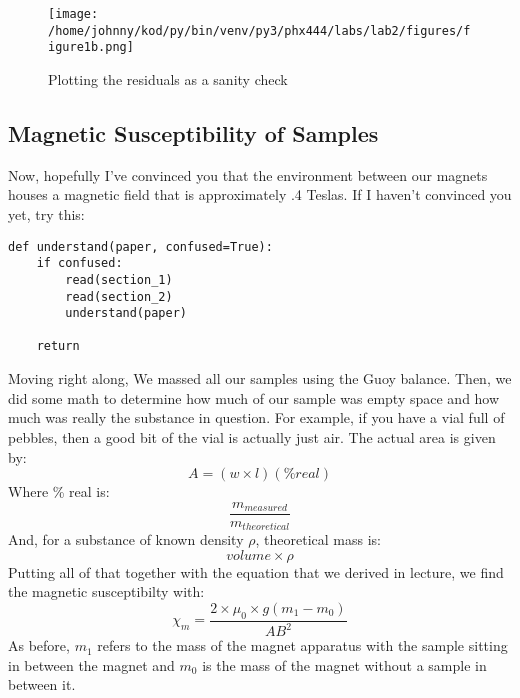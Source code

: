 \documentclass{article}
\begin{document}
\begin{figure}[H]
        \begin{center}
        \texttt{[image: /home/johnny/kod/py/bin/venv/py3/phx444/labs/lab2/figures/figure1b.png]}
        \caption{Plotting the residuals as a sanity check}
        \label{fig:fig_2}
        \end{center}
\end{figure}


\subsection{Magnetic Susceptibility of Samples}
Now, hopefully I've convinced you that the environment between our magnets
houses a magnetic field that is approximately .4 Teslas. If I haven't
convinced you yet, try this:

\begin{center}
\begin{minipage}[t]{.75\textwidth}
\begin{lstlisting}[frame=tlrb]
def understand(paper, confused=True):
    if confused:
        read(section_1)
        read(section_2)
        understand(paper)

    return 
\end{lstlisting}
\end{minipage}
\end{center}

Moving right along, We massed all our samples using the Guoy balance. Then, we
did some math to determine how much of our sample was empty space and how much
was really the substance in question. For example, if you have a vial full of pebbles, then
a good bit of the vial is actually just air. The actual area is given by:
$$A = (w\times l)(\% real)$$
Where \% real is: 
$$\frac{ m_{measured}}{ m_{theoretical}}$$
And, for a substance of known density $\rho$, theoretical mass is:
$$volume \times \rho$$
Putting all of that together with the equation that we derived in lecture, we
find the magnetic susceptibilty with:
$$\chi_m = \frac{2 \times \mu_0 \times g (m_1 - m_0)}{A B^2}$$
As before, $m_1$ refers to the mass of the magnet apparatus with the sample
sitting in between the magnet and $m_0$ is the mass of the magnet without a
sample in between it. 
\end{document}
